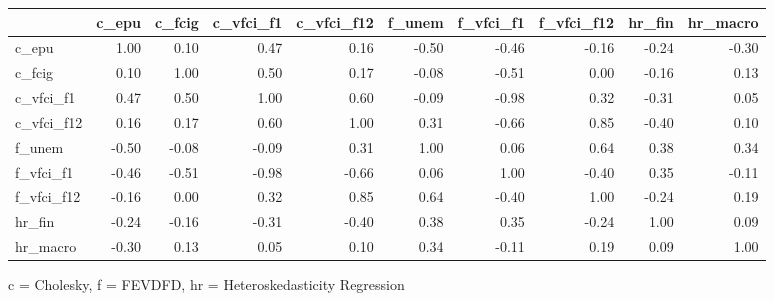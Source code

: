 

\begin{tabular*}{\linewidth}{@{\extracolsep{\fill}}l|rrrrrrrrr}
\toprule
 & c\_epu & c\_fcig & c\_vfci\_f1 & c\_vfci\_f12 & f\_unem & f\_vfci\_f1 & f\_vfci\_f12 & hr\_fin & hr\_macro \\ 
\midrule\addlinespace[2.5pt]
c\_epu & 1.00 & 0.10 & 0.47 & 0.16 & -0.50 & -0.46 & -0.16 & -0.24 & -0.30 \\ 
c\_fcig & 0.10 & 1.00 & 0.50 & 0.17 & -0.08 & -0.51 & 0.00 & -0.16 & 0.13 \\ 
c\_vfci\_f1 & 0.47 & 0.50 & 1.00 & 0.60 & -0.09 & -0.98 & 0.32 & -0.31 & 0.05 \\ 
c\_vfci\_f12 & 0.16 & 0.17 & 0.60 & 1.00 & 0.31 & -0.66 & 0.85 & -0.40 & 0.10 \\ 
f\_unem & -0.50 & -0.08 & -0.09 & 0.31 & 1.00 & 0.06 & 0.64 & 0.38 & 0.34 \\ 
f\_vfci\_f1 & -0.46 & -0.51 & -0.98 & -0.66 & 0.06 & 1.00 & -0.40 & 0.35 & -0.11 \\ 
f\_vfci\_f12 & -0.16 & 0.00 & 0.32 & 0.85 & 0.64 & -0.40 & 1.00 & -0.24 & 0.19 \\ 
hr\_fin & -0.24 & -0.16 & -0.31 & -0.40 & 0.38 & 0.35 & -0.24 & 1.00 & 0.09 \\ 
hr\_macro & -0.30 & 0.13 & 0.05 & 0.10 & 0.34 & -0.11 & 0.19 & 0.09 & 1.00 \\ 
\bottomrule
\end{tabular*}
\begin{minipage}{\linewidth}
c = Cholesky, f = FEVDFD, hr = Heteroskedasticity Regression\\
\end{minipage}


